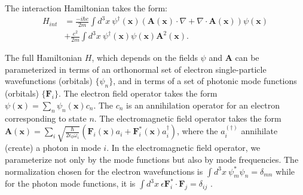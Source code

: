 \documentclass[aps,prl,twocolumn,
	groupedaddress,superscriptaddress,
	amsfonts,amssymb,amsmath,floatfix,
	citeautoscript]{revtex4-1}
\begin{document}
The interaction Hamiltonian takes the form:
\begin{align}
H_{int} &= \frac{-i\hbar e}{2m}\int d^3x ~\psi^{\dagger}(\mathbf{x})(\mathbf{A}(\mathbf{x})\cdot\nabla +  \nabla \cdot \mathbf{A}(\mathbf{x}))\psi(\mathbf{x}) \nonumber \\ &+ \frac{e^2}{2m}\int d^3x ~\psi^{\dagger}(\mathbf{x})\psi(\mathbf{x})\mathbf{A}^2(\mathbf{x}).
\end{align}

The full Hamiltonian $H$, which depends on the fields $\psi$ and $\mathbf{A}$ can be parameterized in terms of an orthonormal set of electron single-particle wavefunctions (orbitals) $\{\psi_n\}$, and in terms of a set of photonic mode functions (orbitals) $\{\mathbf{F}_i\}$. The electron field operator takes the form $\psi(\mathbf{x}) = \sum_n \psi_n(\mathbf{x})c_n$.
The $c_n$ is an annihilation operator for an electron corresponding to state $n$. The electromagnetic field operator takes the form $\mathbf{A}(\mathbf{x}) = \sum_i\sqrt{\frac{\hbar}{2\epsilon_0\omega_i}} \left(\mathbf{F}_i(\mathbf{x})a_i+\mathbf{F}^*_i(\mathbf{x})a^{\dagger}_i\right)$, where the $a_i^{(\dagger)}$ annihilate (create) a photon in mode $i$. In the electromagnetic field operator, we parameterize not only by the mode functions but also by mode frequencies. The normalization chosen for the electron wavefunctions is $\int d^3x~ \psi_m^*\psi_n = \delta_{mn}$ while for the photon mode functions, it is $\int d^3x~\epsilon\mathbf{F}_i^*\cdot\mathbf{F}_j = \delta_{ij}$ \cite{joannopoulos2011photonic}.
\end{document}
